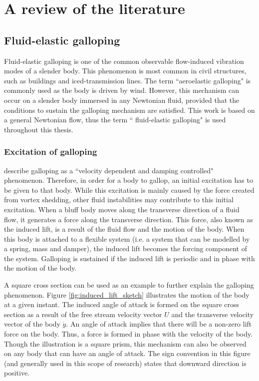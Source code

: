 \chapter{A review of the literature}
\label{chap:lit-review}

\section{Fluid-elastic galloping}
\label{fluid-elastic galloping}

Fluid-elastic galloping is one of the common observable flow-induced vibration modes of a slender body. This phenomenon is most common in civil structures, such as buildings and iced-transmission lines. The term ``aeroelastic galloping" is commonly used as the body is driven by wind. However, this mechanism can occur on a slender body immersed in any Newtonian fluid, provided that the conditions to sustain the galloping mechanism are satisfied. This work is based on a general Newtonian flow, thus the term `` fluid-elastic galloping" is used throughout this thesis.
   

\subsection{Excitation of galloping}
\label{sec:exci-galloping}

\citet{Paidoussis2010} describe galloping as a ``velocity dependent and damping controlled" phenomenon. Therefore, in order for a body to gallop, an initial excitation has to be given to that body. While this excitation is mainly caused by the force created from vortex shedding, other fluid instabilities may contribute to this initial excitation.  When a bluff body moves along the transverse direction of a fluid flow, it generates a force along the transverse direction. This force, also known as the induced lift, is a result of the fluid flow and the motion of the body. When this body is attached to a flexible system (i.e. a system that can be modelled by a spring, mass and damper), the induced lift becomes the forcing component of the system. Galloping is sustained  if the induced lift is periodic and in phase with the motion of the body.





A square cross section can be used as an example to further explain the galloping phenomenon. Figure \ref{fig:induced_lift_sketch}  illustrates the motion of the body at a given instant. The induced angle of attack is formed on the square cross section as a result of the free stream velocity vector $U$ and the transverse velocity vector of the body $\dot{y}$. An angle of attack implies that there will be a non-zero lift force on the body. Thus, a force is formed in phase with the velocity of the body. Though the illustration is a square prism, this mechanism can also be observed on any body that can have an angle of attack. The sign convention in this figure (and generally used in this scope of research) states that downward direction is positive.  

